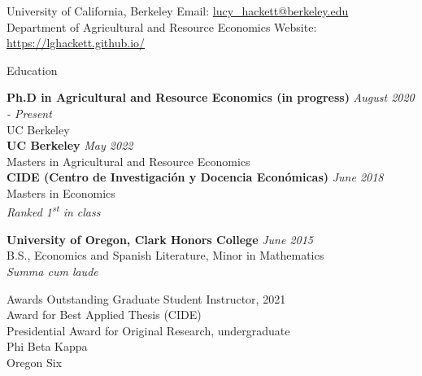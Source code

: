 \documentclass{resume} %
\begin{document}
\begin{rSection}{}
University of California, Berkeley \hfill Email:  \href{mailto:lucy\_hackett@berkeley.edu}{lucy\_hackett@berkeley.edu}\\
Department of Agricultural and Resource Economics \hfill Website:  \href{https://lghackett.github.io/}{https://lghackett.github.io/}\\
\end{rSection}


\begin{rSection}{Education}

{\bf Ph.D in Agricultural and Resource Economics (in progress)} \hfill {\em August 2020 - Present} 
\\ UC Berkeley\hfill \\

{\bf UC Berkeley} \hfill {\em May 2022} 
\\ Masters in Agricultural and Resource Economics\hfill\\

{\bf CIDE (Centro de Investigación y Docencia Económicas)} \hfill {\em June 2018} 
\\ Masters in Economics\hfill\\
\textit{Ranked 1\textsuperscript{st} in class}
\vspace{0.1cm}

{\bf University of Oregon, Clark Honors College} \hfill {\em June 2015} 
\\ B.S., Economics and Spanish Literature, Minor in Mathematics  \hfill\\
\textit{Summa cum laude}
\end{rSection}


\begin{rSection}{Awards} \itemsep -2pt
Outstanding Graduate Student Instructor, 2021 \\
Award for Best Applied Thesis (CIDE)\\
Presidential Award for Original Research, undergraduate \\
Phi Beta Kappa\\
Oregon Six
\end{rSection}
\end{document}
